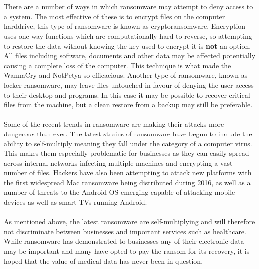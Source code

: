 \documentclass{article}
\begin{document}
\\\\%
There are a number of ways in which ransomware may attempt to deny access to a system. The most effective of these is to encrypt files on the computer harddrive, this type of ransomware is known as cryptoransomware.
Encryption uses one-way functions which are computationally hard to reverse, so attempting to restore the data without knowing the key used to encrypt it is \textbf{not} an option.
All files including software, documents and other data may be affected potentially causing a complete loss of the computer.
This technique is what made the WannaCry and NotPetya so efficacious.
Another type of ransomware, known as locker ransomware, may leave files untouched in favour of denying the user access to their desktop and programs. In this case it may be possible to recover critical files from the machine, but a clean restore from a backup may still be preferable.
\\\\%
Some of the recent trends in ransomware are making their attacks more dangerous than ever.
The latest strains of ransomware have begun to include the ability to self-multiply meaning they fall under the category of a computer virus. This makes them especially problematic for businesses as they can easily spread across internal networks infecting multiple machines and encrypting a vast number of files.
Hackers have also been attempting to attack new platforms with the first widespread Mac ransomware being distributed during 2016, as well as a number of threats to the Android OS emerging capable of attacking mobile devices as well as smart TVs running Android. 
\\\\%
As mentioned above, the latest ransomware are self-multiplying and will therefore not discriminate between businesses and important services such as healthcare.
While ransomware has demonstrated to businesses any of their electronic data may be important\cite{security_breaches_survey} and many have opted to pay the ransom for its recovery, it is hoped that the value of medical data has never been in question.
\end{document}

